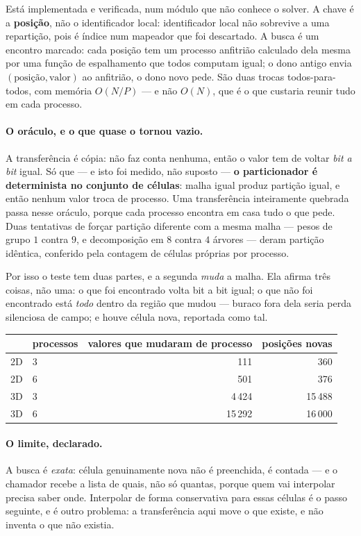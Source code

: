 Está implementada e verificada, num módulo que não conhece o solver. A chave é a
\textbf{posição}, não o identificador local: identificador local não sobrevive a
uma repartição, pois é índice num mapeador que foi descartado. A busca é um
encontro marcado: cada posição tem um processo anfitrião calculado dela mesma
por uma função de espalhamento que todos computam igual; o dono antigo envia
$(\text{posição},\text{valor})$ ao anfitrião, o dono novo pede. São duas trocas
todos-para-todos, com memória $O(N/P)$ --- e não $O(N)$, que é o que custaria
reunir tudo em cada processo.

\paragraph{O oráculo, e o que quase o tornou vazio.} A transferência é cópia:
não faz conta nenhuma, então o valor tem de voltar \emph{bit a bit} igual. Só
que --- e isto foi medido, não suposto --- \textbf{o particionador é
determinista no conjunto de células}: malha igual produz partição igual, e então
nenhum valor troca de processo. Uma transferência inteiramente quebrada passa
nesse oráculo, porque cada processo encontra em casa tudo o que pede. Duas
tentativas de forçar partição diferente com a mesma malha --- pesos de grupo
$1$ contra $9$, e decomposição em $8$ contra $4$ árvores --- deram partição
idêntica, conferido pela contagem de células próprias por processo.

Por isso o teste tem duas partes, e a segunda \emph{muda} a malha. Ela afirma
três coisas, não uma: o que foi encontrado volta bit a bit igual; o que não foi
encontrado está \emph{todo} dentro da região que mudou --- buraco fora dela seria
perda silenciosa de campo; e houve célula nova, reportada como tal.

\begin{center}
\begin{tabular}{llrr}
  \toprule
  & {processos} & {valores que mudaram de processo} & {posições novas} \\
  \midrule
  2D & 3 & 111    & 360 \\
  2D & 6 & 501    & 376 \\
  3D & 3 & 4\,424 & 15\,488 \\
  3D & 6 & 15\,292 & 16\,000 \\
  \bottomrule
\end{tabular}
\end{center}

\paragraph{O limite, declarado.} A busca é \emph{exata}: célula genuinamente
nova não é preenchida, é contada --- e o chamador recebe a lista de quais, não
só quantas, porque quem vai interpolar precisa saber onde. Interpolar de forma
conservativa para essas células é o passo seguinte, e é outro problema: a
transferência aqui move o que existe, e não inventa o que não existia.

